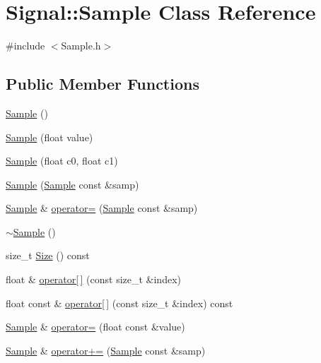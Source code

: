 \hypertarget{class_signal_1_1_sample}{\section{Signal\+:\+:Sample Class Reference}
\label{class_signal_1_1_sample}
}


{\ttfamily \#include $<$Sample.\+h$>$}

\subsection*{Public Member Functions}
\begin{DoxyCompactItemize}
\item 
\hyperlink{class_signal_1_1_sample_aff6a97034407b253ebb14d4b3a7e5477}{Sample} ()
\item 
\hyperlink{class_signal_1_1_sample_a6ecb688115872185693109a628734dc4}{Sample} (float value)
\item 
\hyperlink{class_signal_1_1_sample_a21732177867266f0780fb062428456b2}{Sample} (float c0, float c1)
\item 
\hyperlink{class_signal_1_1_sample_acc0acea8ae798078059f04e988a2640e}{Sample} (\hyperlink{class_signal_1_1_sample}{Sample} const \&samp)
\item 
\hyperlink{class_signal_1_1_sample}{Sample} \& \hyperlink{class_signal_1_1_sample_ac8baed24392811f0752bf6fab175d55a}{operator=} (\hyperlink{class_signal_1_1_sample}{Sample} const \&samp)
\item 
\hyperlink{class_signal_1_1_sample_a4968d6186f36193272bbeaf25e3da7ab}{$\sim$\+Sample} ()
\item 
size\+\_\+t \hyperlink{class_signal_1_1_sample_a3c8f635193c0b7b69612cb189766dfa3}{Size} () const 
\item 
float \& \hyperlink{class_signal_1_1_sample_a3eaf5563822c3bccefc478a8a436020a}{operator\mbox{[}$\,$\mbox{]}} (const size\+\_\+t \&index)
\item 
float const \& \hyperlink{class_signal_1_1_sample_afe8d5109121196a75539c172aa38e09a}{operator\mbox{[}$\,$\mbox{]}} (const size\+\_\+t \&index) const 
\item 
\hyperlink{class_signal_1_1_sample}{Sample} \& \hyperlink{class_signal_1_1_sample_a0b01f12ec802e075f6917f8490ac6813}{operator=} (float const \&value)
\item 
\hyperlink{class_signal_1_1_sample}{Sample} \& \hyperlink{class_signal_1_1_sample_ab70d9c9ef2561b03e0161fb72ede452c}{operator+=} (\hyperlink{class_signal_1_1_sample}{Sample} const \&samp)

\end{DoxyCompactItemize}
